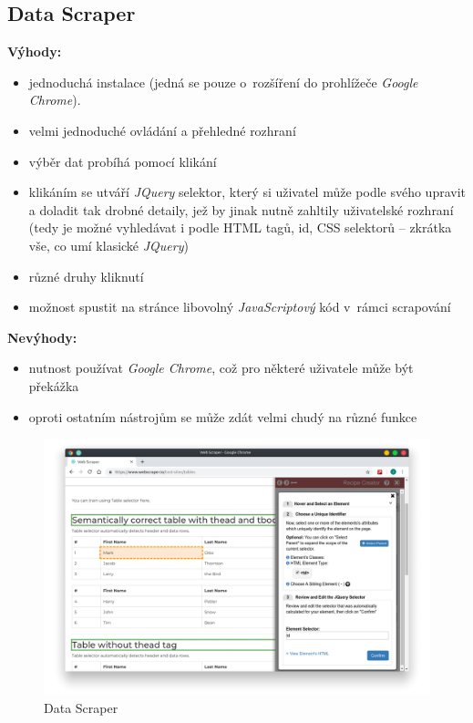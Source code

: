 \documentclass[thesis=B,czech]{FITthesis}[2012/06/26]
\begin{document}
\subsection{Data Scraper}
\textbf{Výhody:}
\begin{itemize}
	\item jednoduchá instalace (jedná se pouze o~rozšíření do prohlížeče \emph{Google Chrome}).
	\item velmi jednoduché ovládání a přehledné rozhraní
	\item výběr dat probíhá pomocí klikání
	\item klikáním se utváří \emph{JQuery} selektor, který si uživatel může podle svého upravit a doladit tak drobné detaily, jež by jinak nutně zahltily uživatelské rozhraní (tedy je možné vyhledávat i podle HTML tagů, id, CSS selektorů -- zkrátka vše, co umí klasické \emph{JQuery})
	\item různé druhy kliknutí
	\item možnost spustit na stránce libovolný \emph{JavaScriptový} kód v~rámci scrapování
\end{itemize}
\textbf{Nevýhody:}
\begin{itemize}
	\item nutnost používat \emph{Google Chrome}, což pro některé uživatele může být překážka
	\item oproti ostatním nástrojům se může zdát velmi chudý na různé funkce
\end{itemize}
\begin{figure}
	\includegraphics[width=\linewidth]{images/DataScraper.png}
	\caption{Data Scraper}
	\label{fig:dataScraper}
\end{figure}
\end{document}
